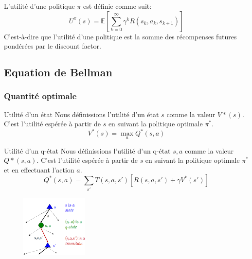 L'utilité d'une politique $\pi$ est définie comme suit: 
\begin{equation}
    U^\pi(s) = \mathbb{E} \left[ \sum_{k=0}^{\infty} \gamma^k R(s_k, a_k, s_{k+1}) \right] 
\end{equation} 
C'est-à-dire que l'utilité d'une politique est la somme des récompenses futures pondérées par le discount factor.


\subsection{Equation de Bellman} %
\label{sub:equation_de_bellman}

\subsubsection{Quantité optimale} %
\label{sec:quantite_optimale}

\begin{definition}{Utilité d'un état}{}
    Nous définissions l'utilité d'un état $s$ comme la valeur $V*(s)$. 
    C'est l'utilité espérée à partir de $s$ en suivant la politique optimale $\pi^*$.
    \begin{equation*}
        V^*(s) = \max_{a} Q^*(s, a) 
    \end{equation*}
\end{definition}

\begin{definition}{Utilité d'un q-état}{}
    Nous définissions l'utilité d'un q-état $s, a$ comme la valeur $Q*(s, a)$. 
    C'est l'utilité espérée à partir de $s$ en suivant la politique optimale $\pi^*$ et en effectuant l'action $a$. 
    \begin{equation*}
        Q^*(s, a) = \sum_{s'} T(s, a, s') \left[ R(s, a, s') + \gamma V^*(s') \right]
    \end{equation*}
\end{definition}

\begin{figure}[H]
    \centering
    \includegraphics[width=0.3\textwidth]{../pictures/bellmantree.png}
    \caption{}\label{fig:}
\end{figure}

